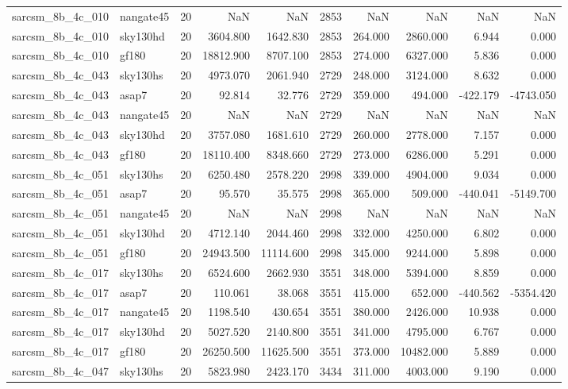 \begin{tabular}{llrrrrrrrr}
sarcsm\_8b\_4c\_010 & nangate45 & 20 & NaN & NaN & 2853 & NaN & NaN & NaN & NaN \\
sarcsm\_8b\_4c\_010 & sky130hd & 20 & 3604.800 & 1642.830 & 2853 & 264.000 & 2860.000 & 6.944 & 0.000 \\
sarcsm\_8b\_4c\_010 & gf180 & 20 & 18812.900 & 8707.100 & 2853 & 274.000 & 6327.000 & 5.836 & 0.000 \\
sarcsm\_8b\_4c\_043 & sky130hs & 20 & 4973.070 & 2061.940 & 2729 & 248.000 & 3124.000 & 8.632 & 0.000 \\
sarcsm\_8b\_4c\_043 & asap7 & 20 & 92.814 & 32.776 & 2729 & 359.000 & 494.000 & -422.179 & -4743.050 \\
sarcsm\_8b\_4c\_043 & nangate45 & 20 & NaN & NaN & 2729 & NaN & NaN & NaN & NaN \\
sarcsm\_8b\_4c\_043 & sky130hd & 20 & 3757.080 & 1681.610 & 2729 & 260.000 & 2778.000 & 7.157 & 0.000 \\
sarcsm\_8b\_4c\_043 & gf180 & 20 & 18110.400 & 8348.660 & 2729 & 273.000 & 6286.000 & 5.291 & 0.000 \\
sarcsm\_8b\_4c\_051 & sky130hs & 20 & 6250.480 & 2578.220 & 2998 & 339.000 & 4904.000 & 9.034 & 0.000 \\
sarcsm\_8b\_4c\_051 & asap7 & 20 & 95.570 & 35.575 & 2998 & 365.000 & 509.000 & -440.041 & -5149.700 \\
sarcsm\_8b\_4c\_051 & nangate45 & 20 & NaN & NaN & 2998 & NaN & NaN & NaN & NaN \\
sarcsm\_8b\_4c\_051 & sky130hd & 20 & 4712.140 & 2044.460 & 2998 & 332.000 & 4250.000 & 6.802 & 0.000 \\
sarcsm\_8b\_4c\_051 & gf180 & 20 & 24943.500 & 11114.600 & 2998 & 345.000 & 9244.000 & 5.898 & 0.000 \\
sarcsm\_8b\_4c\_017 & sky130hs & 20 & 6524.600 & 2662.930 & 3551 & 348.000 & 5394.000 & 8.859 & 0.000 \\
sarcsm\_8b\_4c\_017 & asap7 & 20 & 110.061 & 38.068 & 3551 & 415.000 & 652.000 & -440.562 & -5354.420 \\
sarcsm\_8b\_4c\_017 & nangate45 & 20 & 1198.540 & 430.654 & 3551 & 380.000 & 2426.000 & 10.938 & 0.000 \\
sarcsm\_8b\_4c\_017 & sky130hd & 20 & 5027.520 & 2140.800 & 3551 & 341.000 & 4795.000 & 6.767 & 0.000 \\
sarcsm\_8b\_4c\_017 & gf180 & 20 & 26250.500 & 11625.500 & 3551 & 373.000 & 10482.000 & 5.889 & 0.000 \\
sarcsm\_8b\_4c\_047 & sky130hs & 20 & 5823.980 & 2423.170 & 3434 & 311.000 & 4003.000 & 9.190 & 0.000 \\

\end{tabular}
